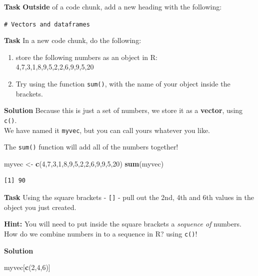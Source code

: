 \documentclass[12pt,]{krantz}
\newenvironment{Shaded}{\begin{snugshade}}{\end{snugshade}}
\newcommand{\DecValTok}[1]{\textcolor[rgb]{0.00,0.00,0.81}{#1}}
\newcommand{\KeywordTok}[1]{\textcolor[rgb]{0.13,0.29,0.53}{\textbf{#1}}}
\newcommand{\NormalTok}[1]{#1}
\newcommand{\StringTok}[1]{\textcolor[rgb]{0.31,0.60,0.02}{#1}}
\providecommand{\tightlist}{%
  \setlength{\itemsep}{0pt}\setlength{\parskip}{0pt}}
\begin{document}
\textbf{Task}
\textbf{Outside} of a code chunk, add a new heading with the following:

\texttt{\#\ Vectors\ and\ dataframes}

\textbf{Task}
In a new code chunk, do the following:

\begin{enumerate}
\def\labelenumi{\arabic{enumi}.}
\tightlist
\item
  store the following numbers as an object in R:\\
  4,7,3,1,8,9,5,2,2,6,9,9,5,20\\
\item
  Try using the function \texttt{sum()}, with the name of your object inside the brackets.
\end{enumerate}

\textbf{Solution }
Because this is just a set of numbers, we store it as a \textbf{vector}, using \texttt{c()}.\\
We have named it \texttt{myvec}, but you can call yours whatever you like.

The \texttt{sum()} function will add all of the numbers together!

\begin{Shaded}
\begin{Highlighting}[]
\NormalTok{myvec <-}\StringTok{ }\KeywordTok{c}\NormalTok{(}\DecValTok{4}\NormalTok{,}\DecValTok{7}\NormalTok{,}\DecValTok{3}\NormalTok{,}\DecValTok{1}\NormalTok{,}\DecValTok{8}\NormalTok{,}\DecValTok{9}\NormalTok{,}\DecValTok{5}\NormalTok{,}\DecValTok{2}\NormalTok{,}\DecValTok{2}\NormalTok{,}\DecValTok{6}\NormalTok{,}\DecValTok{9}\NormalTok{,}\DecValTok{9}\NormalTok{,}\DecValTok{5}\NormalTok{,}\DecValTok{20}\NormalTok{)}
\KeywordTok{sum}\NormalTok{(myvec)}
\end{Highlighting}
\end{Shaded}

\begin{verbatim}
[1] 90
\end{verbatim}

\textbf{Task}
Using the square brackets - \texttt{{[}{]}} - pull out the 2nd, 4th and 6th values in the object you just created.

\textbf{Hint:} You will need to put inside the square brackets a \emph{sequence of} numbers. How do we combine numbers in to a sequence in R? using \texttt{c()}!

\textbf{Solution }

\begin{Shaded}
\begin{Highlighting}[]
\NormalTok{myvec[}\KeywordTok{c}\NormalTok{(}\DecValTok{2}\NormalTok{,}\DecValTok{4}\NormalTok{,}\DecValTok{6}\NormalTok{)]}
\end{Highlighting}
\end{Shaded}
\end{document}
